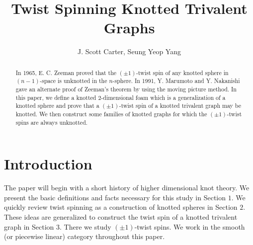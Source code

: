 \documentclass{amsart}
\theoremstyle{definition}
\theoremstyle{remark}
\numberwithin{equation}{section}
\begin{document}
\title{Twist Spinning Knotted Trivalent Graphs}
\author{J. Scott Carter, Seung Yeop Yang}

\date{}


\begin{abstract}



In 1965, E. C. Zeeman proved that the $(\pm1)$-twist spin of any knotted sphere in $(n-1)$-space is unknotted in the $n$-sphere. In 1991, Y. Marumoto and Y. Nakanishi gave an alternate proof of Zeeman's theorem by using the moving picture method. In this paper, we define a knotted $2$-dimensional foam which is a generalization of a knotted sphere and prove that a $(\pm1)$-twist spin of a knotted trivalent graph may be knotted. We then construct some families of knotted graphs for which the  $(\pm1)$-twist spins are always unknotted.


\end{abstract}

\maketitle






\section{Introduction}

The paper will begin with a short history of higher dimensional knot theory. We present the basic definitions and facts  necessary for this study in Section $1$. We quickly review twist spinning as a construction of knotted spheres in Section $2$.  These ideas are generalized to construct the twist spin of a knotted trivalent graph in Section $3$. There we study $(\pm 1)$-twist spins. 
We work in the smooth (or piecewise linear) category throughout this paper.
\end{document}
